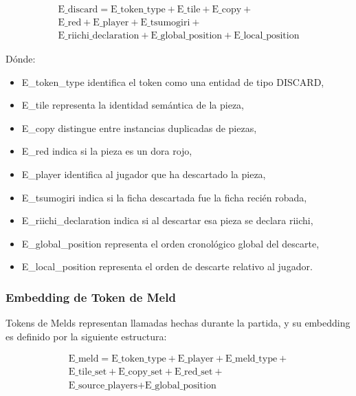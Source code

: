 \begin{equation}
  \begin{split}
    \text{E\_discard} = \text{E\_token\_type} + \text{E\_tile} + \text{E\_copy} + \\ \text{E\_red} + \text{E\_player} + \text{E\_tsumogiri} + \\ \text{E\_riichi\_declaration} + \text{E\_global\_position} + \text{E\_local\_position}
  \end{split}
\end{equation}

Dónde:

\begin{itemize}
  \item E\_token\_type identifica el token como una entidad de tipo DISCARD,
  \item E\_tile representa la identidad semántica de la pieza,
  \item E\_copy distingue entre instancias duplicadas de piezas,
  \item E\_red indica si la pieza es un dora rojo,
  \item E\_player identifica al jugador que ha descartado la pieza,
  \item E\_tsumogiri indica si la ficha descartada fue la ficha recién robada,
  \item E\_riichi\_declaration indica si al descartar esa pieza se declara riichi,
  \item E\_global\_position representa el orden cronológico global del descarte,
  \item E\_local\_position representa el orden de descarte relativo al jugador.
\end{itemize}

\subsubsection{Embedding de Token de Meld}

Tokens de Melds representan llamadas hechas durante la partida, y su embedding es definido por la siguiente estructura:

\begin{equation}
  \begin{split}
    \text{E\_meld} = \text{E\_token\_type} + \text{E\_player} + \text{E\_meld\_type} + \\ \text{E\_tile\_set} + \text{E\_copy\_set} + \text{E\_red\_set} + \\ \text{E\_source\_players} + \text{E\_global\_position}
  \end{split}
\end{equation}


